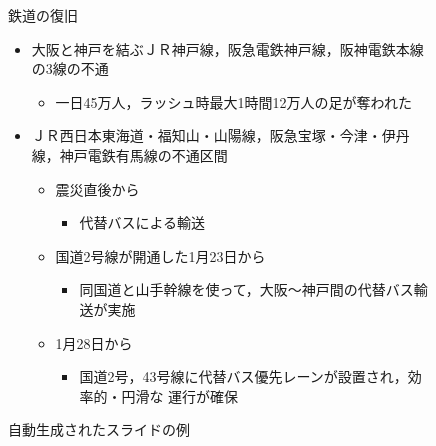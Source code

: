 \begin{figure}[t]
\begin{center}
\begin{minipage}[t]{\hsize}
\begin{shadebox}
\vspace{2mm}
\begin{center}鉄道の復旧\end{center}
\begin{itemize}
\item 大阪と神戸を結ぶＪＲ神戸線，阪急電鉄神戸線，阪神電鉄本線の3線の不通
\begin{itemize}
\item 一日45万人，ラッシュ時最大1時間12万人の足が奪われた
\end{itemize}

\item ＪＲ西日本東海道・福知山・山陽線，阪急宝塚・今津・伊丹線，神戸電鉄有馬線の不通区間
\begin{itemize}
 \item 震災直後から
  \begin{itemize}
   \item 代替バスによる輸送
  \end{itemize}
 \item 国道2号線が開通した1月23日から
   \begin{itemize}
    \item 同国道と山手幹線を使って，大阪〜神戸間の代替バス輸送が実施
   \end{itemize}
 \item 1月28日から
       \begin{itemize}
    \item 国道2号，43号線に代替バス優先レーンが設置され，効率的・円滑な
	  運行が確保
 \end{itemize}
\end{itemize}
\end{itemize}
\vspace{2mm}
\end{shadebox}

 \end{minipage}
\end{center}
\caption{自動生成されたスライドの例}
\label{fig:slide_example}
\end{figure}

